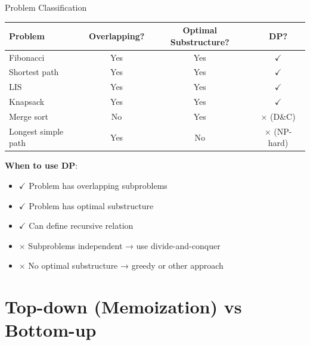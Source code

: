 \documentclass[aspectratio=169]{beamer}
\begin{document}
\begin{frame}{Problem Classification}
  \begin{center}
  \begin{tabular}{|l|c|c|c|}
    \hline
    \textbf{Problem} & \textbf{Overlapping?} & \textbf{Optimal Substructure?} & \textbf{DP?} \\
    \hline
    Fibonacci & Yes & Yes & $\checkmark$ \\
    Shortest path & Yes & Yes & $\checkmark$ \\
    LIS & Yes & Yes & $\checkmark$ \\
    Knapsack & Yes & Yes & $\checkmark$ \\
    \hline
    Merge sort & No & Yes & $\times$ (D\&C) \\
    Longest simple path & Yes & No & $\times$ (NP-hard) \\
    \hline
  \end{tabular}
  \end{center}

  \vspace{0.5cm}

  \textbf{When to use DP}:
  \begin{itemize}
    \item $\checkmark$ Problem has overlapping subproblems
    \item $\checkmark$ Problem has optimal substructure
    \item $\checkmark$ Can define recursive relation
    \item $\times$ Subproblems independent → use divide-and-conquer
    \item $\times$ No optimal substructure → greedy or other approach
  \end{itemize}
\end{frame}

\section{Top-down (Memoization) vs Bottom-up}
\end{document}
